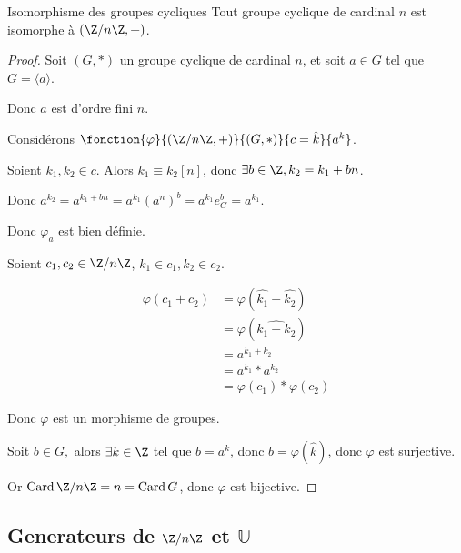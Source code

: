 \begin{theoreme}{Isomorphisme des groupes cycliques}{}
    Tout groupe cyclique de cardinal $n$ est isomorphe à $(\Z/n\Z, +)$.
\end{theoreme}


\begin{proof}
    Soit $(G, \ast)$ un groupe cyclique de cardinal $n$, et soit $a \in G$ tel que $G = \langle a \rangle$.

    Donc $a$ est d'ordre fini $n$.

    Considérons $\fonction{\varphi}{(\Z/n\Z, +)}{(G, \ast)}{c = \hat k}{a^k}$.


    \svspace Soient $k_1, k_2 \in c$. Alors $k_1 \equiv k_2 [n]$, donc $\exists b \in \Z, k_2 = k_1 + bn$.
    
    Donc $a^{k_2} = a^{k_1 + bn} = a^{k_1} (a^n)^b = a^{k_1} e_G^b = a^{k_1}$.

    Donc $\varphi_a$ est bien définie.


    \svspace Soient $c_1, c_2 \in \Z/n\Z$, $k_1 \in c_1, k_2 \in c_2$.

    $$ \begin{aligned}
        \varphi(c_1 + c_2) & = \varphi(\hat{k_1} + \hat{k_2}) \\
        & = \varphi(\widehat{k_1 + k_2}) \\
        & = a^{k_1 + k_2} \\
        & = a^{k_1} \ast a^{k_2} \\
        & = \varphi(c_1) \ast \varphi(c_2)
    \end{aligned}$$

    Donc $\varphi$ est un morphisme de groupes.

    Soit $b \in G, $ alors $\exists k \in \Z$ tel que $b = a^k$, donc $b = \varphi(\hat k)$, donc $\varphi$ est surjective.

    Or $\operatorname{Card} \Z/n\Z = n = \operatorname{Card} G$, donc $\varphi$ est bijective.
\end{proof}

\subsection{Generateurs de \texorpdfstring{$\Z / n \Z$}{Z/nZ} et \texorpdfstring{$\mathbb U$}{U}}

